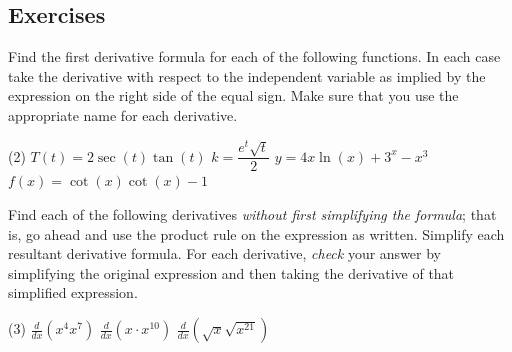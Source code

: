 \documentclass[10pt,oneside,]{book}
\theoremstyle{plain}
\theoremstyle{definition}
\numberwithin{equation}{section}
\newcommand{\fe}[2]{#1\mathopen{}\left(#2\right)\mathclose{}}
\newcommand{\lzoo}[2]{{\frac{d}{d#1}}{\left(#2\right)}}
\begin{document}
\subsection[Exercises]{Exercises}\label{exercises-37}
\hypertarget{exercisegroup-76}{\null}Find the first derivative formula for each of the following functions.  In each case take the derivative with respect to the independent variable as implied by the expression on the right side of the equal sign.  Make sure that you use the appropriate name for each derivative.%
\par
\begin{exercisegroup}(2)
\exercise[1.]\hypertarget{exercise-371}{\null}\(\fe{T}{t}=2\fe{\sec}{t}\fe{\tan}{t}\)%
\exercise[2.]\hypertarget{exercise-372}{\null}\(k=\dfrac{e^t\sqrt{t}}{2}\)%
\exercise[3.]\hypertarget{exercise-373}{\null}\(y=4x\fe{\ln}{x}+3^x-x^3\)%
\exercise[4.]\hypertarget{exercise-374}{\null}\(\fe{f}{x}=\fe{\cot}{x}\fe{\cot}{x}-1\)%
\end{exercisegroup}
\par\smallskip\noindent
\hypertarget{exercisegroup-unsimplified-product}{\null}Find each of the following derivatives \emph{without first simplifying the formula}; that is, go ahead and use the product rule on the expression as written. Simplify each resultant derivative formula.  For each derivative, \emph{check} your answer by simplifying the original expression and then taking the derivative of that simplified expression.%
\par
\begin{exercisegroup}(3)
\exercise[5.]\hypertarget{unsimplified-product-first}{\null}\(\lzoo{x}{x^4x^7}\)%
\exercise[6.]\hypertarget{exercise-376}{\null}\(\lzoo{x}{x\cdot x^{10}}\)%
\exercise[7.]\hypertarget{unsimplified-product-last}{\null}\(\lzoo{x}{\sqrt{x}\sqrt{x^{21}}}\)%
\end{exercisegroup}
\par\smallskip\noindent
\typeout{************************************************}
\typeout{************************************************}
\end{document}
